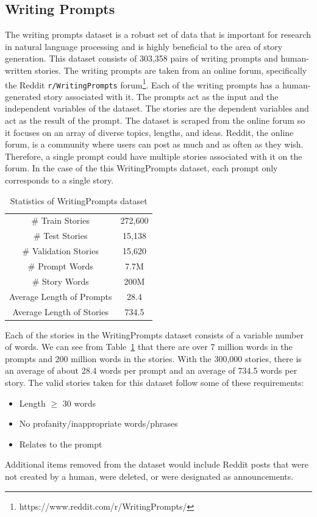 \documentclass[letterpaper]{article}
\begin{document}
\subsection{Writing Prompts}

The writing prompts dataset is a robust set of data that is important for research in natural language processing and is highly beneficial to the area of story generation. This dataset consists of 303,358 pairs of writing prompts and human-written stories. The writing prompts are taken from an online forum, specifically the Reddit  \texttt{r/WritingPrompts} forum\footnote{https://www.reddit.com/r/WritingPrompts/}. Each of the writing prompts has a human-generated story associated with it. The prompts act as the input and the independent variables of the dataset. The stories are the dependent variables and act as the result of the prompt. The dataset is scraped from the online forum so it focuses on an array of diverse topics, lengths, and ideas. Reddit, the online forum, is a community where users can post as much and as often as they wish. Therefore, a single prompt could have multiple stories associated with it on the forum. In the case of the this WritingPrompts dataset, each prompt only corresponds to a single story.

\begin{table}[htbp]
\centering
\begin{tabular}{c c}
\hline
\# Train Stories & 272,600 \\
\# Test Stories & 15,138 \\
\# Validation Stories & 15,620 \\
\hline
\# Prompt Words & 7.7M \\
\# Story Words & 200M \\
\hline
Average Length of Prompts & 28.4 \\
Average Length of Stories & 734.5 \\
\hline
\end{tabular}
\caption{Statistics of WritingPrompts dataset}
\label{table:stat}
\end{table}


Each of the stories in the WritingPrompts dataset consists of a variable number of words. We can see from Table~\ref{table:stat} that there are over 7 million words in the prompts and 200 million words in the stories. With the 300,000 stories, there is an average of about 28.4 words per prompt and an average of 734.5 words per story. The valid stories taken for this dataset follow some of these requirements:
\begin{itemize}
    \item Length $\geq$ 30 words
    \item No profanity/inappropriate words/phrases
    \item Relates to the prompt
\end{itemize}
Additional items removed from the dataset would include Reddit posts that were not created by a human, were deleted, or were designated as announcements.
\end{document}
